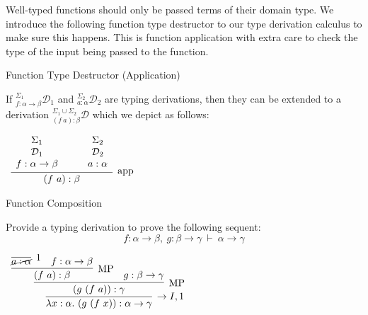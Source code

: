 \documentclass{book}
\begin{document}
            Well-typed functions should only be passed terms of their domain type. We introduce the following function type destructor to our type derivation calculus to make sure this happens. This is function application with extra care to check the type of the input being passed to the function. 
        
        \begin{definition}{Function Type Destructor (Application)}
    
            If $^{\Sigma_{1}}_{f : \alpha \rightarrow \beta}\mathcal{D}_{1}$ and $^{\Sigma_{2}}_{a : \alpha}\mathcal{D}_{2}$ are typing derivations, then they can be extended to a derivation $^{\Sigma_{1}\cup \Sigma_{2}}_{(f \ a) : \beta}\mathcal{D}$ which we depict as follows: 
    
            \begin{center}
                $\begin{array}{c}		
                    \infer[\app]{(f \ a) : \beta}{\begin{array}{c} \Sigma_{1} \\ \mathcal{D}_{1} \\ f : \alpha \rightarrow \beta \end{array} \quad & \begin{array}{c} \Sigma_{2} \\ \mathcal{D}_{2} \\  a : \alpha \end{array}}	
                \end{array}$
            \end{center}
        \end{definition}
    
        \newpage
        \begin{eg}{Function Composition}
    
            Provide a typing derivation to prove the following sequent: $$f : \alpha \to \beta, \ g : \beta \to \gamma \ \vdash \ \alpha \to \gamma $$
        
            \begin{center}
                $\begin{array}{c}
                    \infer[\to I,1]{\lambda x : \alpha. \ (g \ (f \ x)) : \alpha \to \gamma}
                        {\infer[\MP]{(g \ (f \ a)) : \gamma}
                            {\infer[\MP]{(f \ a) : \beta}
                                {\infer[1]{\cancel{a : \alpha}}{} & f : \alpha \to \beta}
                            &
                            g : \beta \to \gamma}}
                \end{array}$
            \end{center}
    
        \end{eg}
\end{document}
